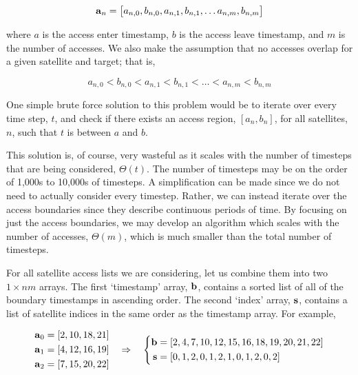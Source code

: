 \begin{equation} 
    \bm{\mathrm{a}}_{n} = \left[ a_{n,0}, b_{n,0}, a_{n,1}, b_{n,1}, \ldots a_{n,m}, b_{n,m} \right]
\end{equation}


where $a$ is the access enter timestamp, $b$ is the access leave timestamp, and
$m$ is the number of accesses. We also make the assumption that no accesses
overlap for a given satellite and target; that is,

\[
    a_{n,0} < b_{n,0} < a_{n,1} < b_{n,1} < \ldots < a_{n,m} < b_{n,m}
\]

One simple brute force solution to this problem would be to iterate over every
time step, $t$, and check if there exists an access region, $[a_n,b_n]$, for all
satellites, $n$, such that $t$ is between $a$ and $b$.

This solution is, of course, very wasteful as it scales with the number of
timesteps that are being considered, $\Theta(t)$. The number of timesteps may
be on the order of 1,000s to 10,000s of timesteps. A simplification can be made
since we do not need to actually consider every timestep. Rather, we can
instead iterate over the access boundaries since they describe continuous
periods of time. By focusing on just the access boundaries, we may develop an
algorithm which scales with the number of accesses, $\Theta(m)$, which is much
smaller than the total number of timesteps.

For all satellite access lists we are considering, let us combine them into two
$1\times nm$ arrays. The first `timestamp' array, $\bm{\mathrm{b}}$, contains a sorted
list of all of the boundary timestamps in ascending order. The second `index'
array, $\bm{\mathrm{s}}$, contains a list of satellite indices in the same order as the
timestamp array. For example,

\begin{equation*}
    \begin{aligned} 
	\bm{\mathrm{a}}_{0} &= \left[ 2, 10, 18, 21  \right] \\
	\bm{\mathrm{a}}_{1} &= \left[ 4, 12, 16, 19  \right] \\
	\bm{\mathrm{a}}_{2} &= \left[ 7, 15, 20, 22  \right] \\
    \end{aligned}
    \quad \Rightarrow \quad
    \left \{ 
	\begin{aligned}
	    \bm{\mathrm{b}} &= [ 2 , 4 , 7 , 10 , 12 , 15 , 16 , 18 , 19 , 20 , 21 , 22  ] \\
	    \bm{\mathrm{s}} &= [ 0 , 1 , 2 , 0 , 1 , 2 , 1 , 0 , 1 , 2 , 0 , 2  ]
	\end{aligned}
    \right.
\end{equation*}

